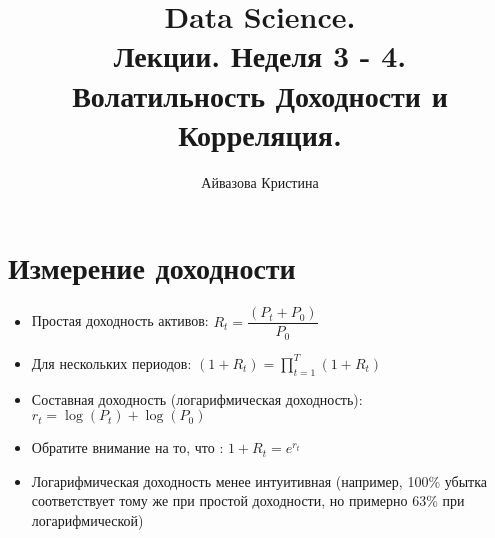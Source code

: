 \documentclass{article}
\title{Data Science.\\
Лекции. Неделя 3 - 4. \\
Волатильность Доходности и Корреляция.}
\author{Айвазова Кристина}
\begin{document}
\maketitle

\setcounter{tocdepth}{1} %
\renewcommand\contentsname{Contents}
\tableofcontents
\newpage




\renewcommand{\labelitemi}{\tiny$\bullet$}
\renewcommand{\figurename}{Fig.}


\section{Измерение доходности}
\begin{itemize}
  \item Простая доходность активов: \(R_t = \dfrac{(P_t + P_0)}{P_0}\)
  \item Для нескольких периодов: \((1+R_t) = \prod_{t=1}^T(1+R_t)\)
  \item Составная доходность (логарифмическая доходность): \(r_t = \log (P_t) + \log (P_0)\)
  \item Обратите внимание на то, что : \(1+R_t = e^{r_t}\)
  \item Логарифмическая доходность менее интуитивная (например, 100\% убытка соответствует тому же при простой доходности, но примерно 63\% при логарифмической)
\end{itemize}
\end{document}
